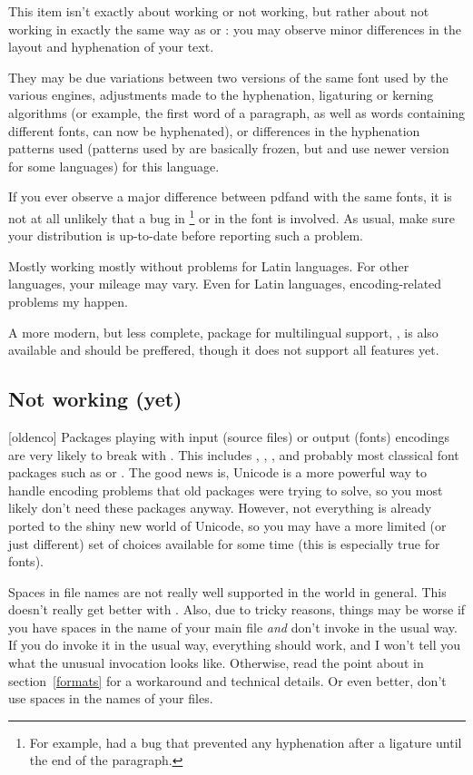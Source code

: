 \documentclass{lltxdoc}
\begin{document}
This item isn't exactly about working or not working, but rather about not
working in exactly the same way as \pdftex or \xetex: you may observe minor
differences in the layout and hyphenation of your text.

They may be due variations between two versions of the same font used by the
various engines, adjustments made to the hyphenation, ligaturing or kerning
algorithms (or example, the first word of a paragraph, as well as words
containing different fonts, can now be hyphenated), or differences in the
hyphenation patterns used (patterns used by \pdftex are basically frozen, but
\luatex and \xetex use newer version for some languages) for this language.

If you ever observe a major difference between pdf\latex and \lualatex with
the same fonts, it is not at all unlikely that a bug in \luatex\footnote{For
  example,  had a bug that prevented any hyphenation after a
  \code{-{}-{}-} ligature until the end of the paragraph.} or in the font is
involved. As usual, make sure your distribution is up-to-date before reporting
such a problem.

Mostly working mostly without problems for Latin languages. For other
languages, your mileage may vary. Even for Latin languages, encoding-related
problems my happen.

A more modern, but less complete, package for multilingual support,
, is also available and should be preffered, though it does
not support all  features yet.

\subsection{Not working (yet)}\label{notworking}

[oldenco] Packages playing with input (source files) or
output (fonts) encodings are very likely to break with \luatex. This includes
, , , and probably most classical font
packages such as  or . The good news
is, Unicode is a more powerful way to handle encoding problems that old
packages were trying to solve, so you most likely don't need these packages
anyway. However, not everything is already ported to the shiny new world of
Unicode, so you may have a more limited (or just different) set of choices
available for some time (this is especially true for fonts).

 Spaces in file names are not really well supported in the \tex
world in general. This doesn't really get better with \luatex. Also, due to
tricky reasons, things may be worse if you have spaces in the name of your main
\tex file \emph{and} don't invoke \luatex in the usual way. If you do
invoke it in the usual way, everything should work, and I won't tell you what
the unusual invocation looks like. Otherwise, read the point about
 in section~\ref{formats} for a workaround and technical
details. Or even better, don't use spaces in the names of your \tex files.
\end{document}
